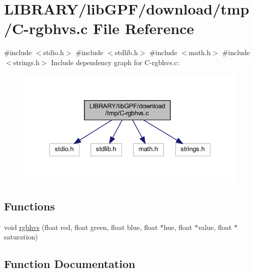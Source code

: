 \hypertarget{C-rgbhvs_8c}{}\section{L\+I\+B\+R\+A\+R\+Y/lib\+G\+P\+F/download/tmp/\+C-\/rgbhvs.c File Reference}
\label{C-rgbhvs_8c}
{\ttfamily \#include $<$stdio.\+h$>$}\newline
{\ttfamily \#include $<$stdlib.\+h$>$}\newline
{\ttfamily \#include $<$math.\+h$>$}\newline
{\ttfamily \#include $<$strings.\+h$>$}\newline
Include dependency graph for C-\/rgbhvs.c\+:
\nopagebreak
\begin{figure}[H]
\begin{center}
\leavevmode
\includegraphics[width=330pt]{C-rgbhvs_8c__incl}
\end{center}
\end{figure}
\subsection*{Functions}
\begin{DoxyCompactItemize}
\item 
void \hyperlink{C-rgbhvs_8c_a4110202639bfb2a997338ea37775dca8}{rgbhvs} (float red, float green, float blue, float $\ast$hue, float $\ast$value, float $\ast$saturation)
\end{DoxyCompactItemize}


\subsection{Function Documentation}
\mbox{\label{C-rgbhvs_8c_a4110202639bfb2a997338ea37775dca8}} 
